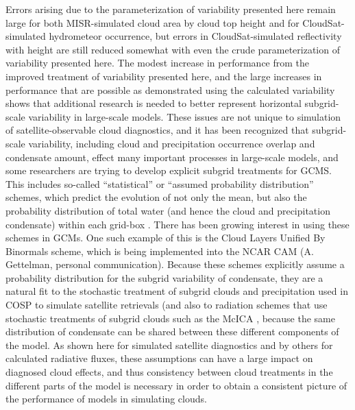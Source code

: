 Errors arising due to the parameterization of variability presented here
remain large for both MISR-simulated cloud area by cloud top height and
for CloudSat-simulated hydrometeor occurrence, but errors in
CloudSat-simulated reflectivity with height are still reduced somewhat
with even the crude parameterization of variability presented here. The
modest increase in performance from the improved treatment of
variability presented here, and the large increases in performance that
are possible as demonstrated using the calculated variability shows that
additional research is needed to better represent horizontal
subgrid-scale variability in large-scale models. These issues are not
unique to simulation of satellite-observable cloud diagnostics, and it
has been recognized that subgrid-scale variability, including cloud and
precipitation occurrence overlap and condensate amount, effect many
important processes in large-scale models, and some researchers are
trying to develop explicit subgrid treatments for GCMS. This includes
so-called ``statistical'' or ``assumed probability distribution''
schemes, which predict the evolution of not only the mean, but also the
probability distribution of total water (and hence the cloud and
precipitation condensate) within each grid-box
\citep[e.g.;][]{tompkins_2002}. There has been growing interest in using
these schemes in GCMs. One such example of this is the Cloud Layers
Unified By Binormals \citep[CLUBB;][]{golaz_et_al_2002} scheme, which is
being implemented into the NCAR CAM (A. Gettelman, personal
communication). Because these schemes explicitly assume a probability
distribution for the subgrid variability of condensate, they are a
natural fit to the stochastic treatment of subgrid clouds and
precipitation used in COSP to simulate satellite retrievals (and also to
radiation schemes that use stochastic treatments of subgrid clouds such
as the McICA \citep{pincus_et_al_2003}, because the same distribution of
condensate can be shared between these different components of the
model. As shown here for simulated satellite diagnostics and by others
for calculated radiative fluxes, these assumptions can have a large
impact on diagnosed cloud effects, and thus consistency between cloud
treatments in the different parts of the model is necessary in order to
obtain a consistent picture of the performance of models in simulating
clouds.
